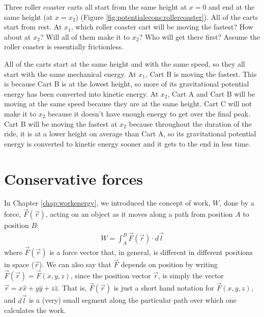 \begin{opening}
Three roller coaster carts all start from the same height at $x=0$ and end at the same height (at $x=x_2$) (Figure \ref{fig:potentialecons:rollercoaster}). All of the carts start from rest. At $x_1$, which roller coaster cart will be moving the fastest? How about at  $x_2$? Will all of them make it to $x_2$? Who will get there first?  Assume the roller coaster is essentially frictionless.
\begin{answer}
All of the carts start at the same height and with the same speed, so they all start with the same mechanical energy. At $x_1$, Cart B is moving the fastest. This is because Cart B is at the lowest height, so more of its gravitational potential energy has been converted into kinetic energy. At $x_2$, Cart A and Cart B will be moving at the same speed because they are at the same height. Cart C will not make it to $x_2$ because it doesn't have enough energy to get over the final peak. Cart B will be moving the fastest at $x_2$ because throughout the duration of the ride, it is at a lower height on average than Cart A, so its gravitational potential energy is converted to kinetic energy sooner and it gets to the end in less time.   
\end{answer}
\end{opening}

\section{Conservative forces}
In Chapter \ref{chap:workenergy}, we introduced the concept of work, $W$, done by a force, $\vec F(\vec r)$, acting on an object as it moves along a path from position $A$ to position $B$:
\begin{align}
\label{eq:potentialecons:workdef}
W = \int_A^B \vec F(\vec r) \cdot d\vec l
\end{align}
where $\vec F(\vec r)$ is a force vector that, in general, is different in different positions in space ($\vec r$). We can also say that $\vec F$ depends on position by writing $\vec F(\vec r)=\vec F(x,y,z)$, since the position vector $\vec r$, is simply the vector $\vec r = x\hat x + y \hat y+ z\hat z$. That is, $\vec F(\vec r)$ is just a short hand notation for $\vec F(x,y,z)$, and $d\vec l$ is a (very) small segment along the particular path over which one calculates the work.

